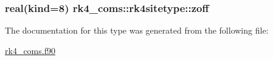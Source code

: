 \subsubsection[{\texorpdfstring{zoff}{zoff}}]{\setlength{\rightskip}{0pt plus 5cm}real(kind=8) rk4\+\_\+coms\+::rk4sitetype\+::zoff}\hypertarget{structrk4__coms_1_1rk4sitetype_ae287d5e2de06575d3a27e51b5fce0acd}{}\label{structrk4__coms_1_1rk4sitetype_ae287d5e2de06575d3a27e51b5fce0acd}


The documentation for this type was generated from the following file\+:\begin{DoxyCompactItemize}
\item 
\hyperlink{rk4__coms_8f90}{rk4\+\_\+coms.\+f90}\end{DoxyCompactItemize}
